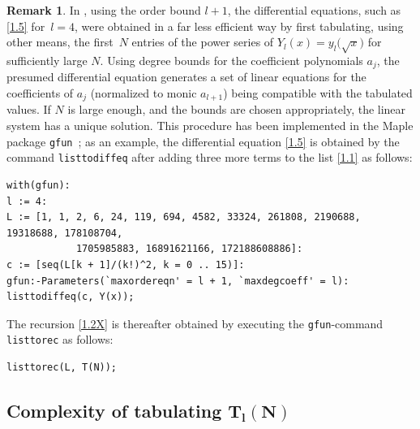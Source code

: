 \documentclass[pdftex]{sigma}
\numberwithin{equation}{section}
\theoremstyle{definition}
\newtheorem{Remark}[Theorem]{Remark}
\begin{document}
\begin{Remark} In \cite{BG00}, using the order bound $l+1$, the differential equations, such as \eqref{1.5} for~${l=4}$, were obtained in a far less efficient way by first tabulating, using other means, the first~$N$ entries of the power series of $Y_l(x) = y_l\bigl(\sqrt{x}\bigr)$
for sufficiently large $N$.
Using degree bounds for the coefficient polynomials $a_j$, the presumed differential equation generates a set of linear equations for the coefficients of $a_j$ (normalized to monic $a_{l+1}$) being compatible with the tabulated values. If $N$ is large enough, and the bounds are chosen appropriately, the linear system has a unique solution. This procedure has been implemented in the Maple package {\tt gfun}~\cite{SZ94}; as an example, the differential equation \eqref{1.5} is obtained by the command {\tt listtodiffeq} after adding three more terms to the list \eqref{1.1} as follows:

\begin{minipage}{0.8\textwidth}{\small
\begin{verbatim}
with(gfun):
l := 4:
L := [1, 1, 2, 6, 24, 119, 694, 4582, 33324, 261808, 2190688, 19318688, 178108704,
		    1705985883, 16891621166, 172188608886]:
c := [seq(L[k + 1]/(k!)^2, k = 0 .. 15)]:
gfun:-Parameters(`maxordereqn' = l + 1, `maxdegcoeff' = l):
listtodiffeq(c, Y(x));
\end{verbatim}}
\end{minipage}
\medskip

\noindent The recursion \eqref{1.2X} is thereafter obtained by executing the {\tt gfun}-command {\tt listtorec} as follows:

\medskip
\begin{minipage}{0.8\textwidth}{\small
\begin{verbatim}
listtorec(L, T(N));
\end{verbatim}}
\end{minipage}
\end{Remark}

\subsection[Complexity of tabulating T\_l(N)]{Complexity of tabulating $\boldsymbol{T_l(N)}$}\label{appB2}
\end{document}
